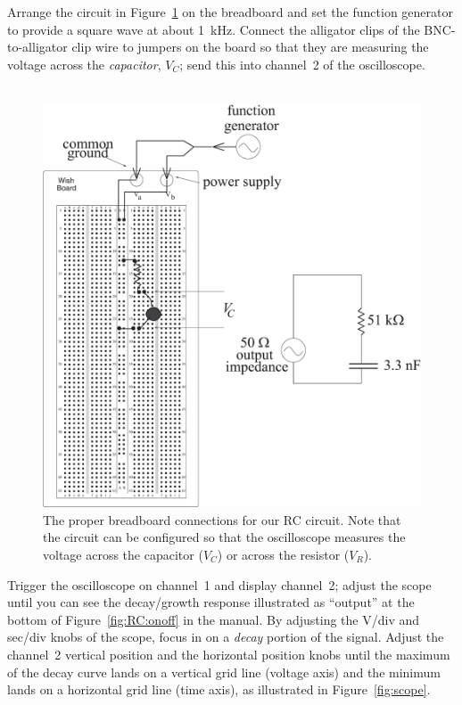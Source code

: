 \noindent Arrange the circuit in Figure~\ref{fig:rcboard} on 
the breadboard and set the 
function generator to provide a square wave at about 1~kHz.  Connect the 
alligator clips of the BNC-to-alligator clip wire to jumpers on the board 
so that they are measuring the voltage across the {\it capacitor}, $V_C$; 
send this into channel~2 of the oscilloscope. \\
\ \\
\clearpage
\begin{figure}[htb]
\epsfxsize=15cm
\centering 
\includegraphics[scale=0.4]{5_rccircuits/rcboard.eps}
\caption{The proper breadboard connections for our RC circuit. Note that the
circuit can be configured so that the oscilloscope measures the voltage across
the capacitor ($V_C$) or across the resistor ($V_R$).} 
\label{fig:rcboard}
\end{figure}

\clearpage

\noindent Trigger the oscilloscope on 
channel~1 and display channel~2; adjust the scope until
you can see the decay/growth response illustrated as ``output'' at the bottom
of Figure~\ref{fig:RC:onoff} in the manual.  By adjusting the V/div and
sec/div knobs of the scope, focus in on a {\it decay} portion of the signal. Adjust the channel~2
vertical position and the horizontal position knobs until the maximum of the 
decay curve lands on a vertical grid line (voltage axis) and the minimum lands 
on a horizontal grid line (time axis), as illustrated in 
Figure~\ref{fig:scope}. \\

